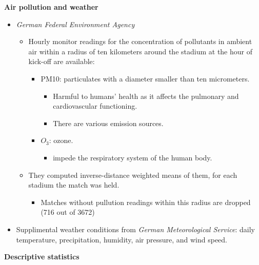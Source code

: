 \documentclass[../root]{subfiles}
\begin{document}
    \textbf{Air pollution and weather}
    \begin{itemize}
      \item \textit{German Federal Environment Agency}
      \begin{itemize}
        \item Hourly monitor readings for the concentration of pollutants in ambient air within a radius of ten kilometers around the stadium at the hour of kick-off are available:
        \begin{itemize}
          \item PM10: particulates with a diameter smaller than ten micrometers.
          \begin{itemize}
            \item Harmful to humans' health as it affects the pulmonary and cardiovascular functioning.
            \item There are various emission sources.
          \end{itemize}
          \item $O_3$: ozone.
          \begin{itemize}
            \item impede the respiratory system of the human body.
          \end{itemize}
        \end{itemize}
        \item They computed inverse-distance weighted means of them, for each stadium the match was held.
        \begin{itemize}
          \item Matches without pullution readings within this radius are dropped (716 out of 3672)
        \end{itemize}
      \end{itemize}
      \item Supplimental weather conditions from \textit{German Meteorological Service}: daily temperature, precipitation, humidity, air pressure, and wind speed.
    \end{itemize}
    \textbf{Descriptive statistics}
\end{document}
